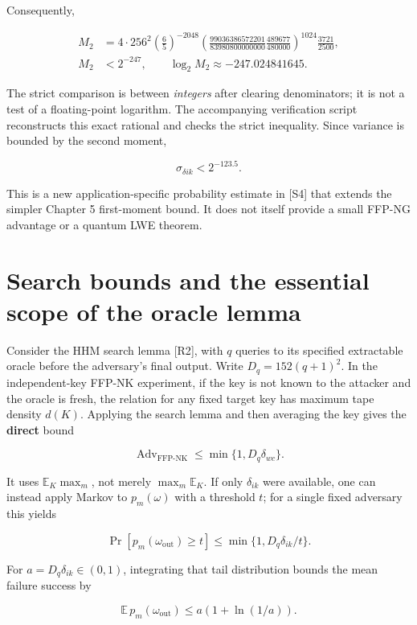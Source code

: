 \documentclass[
  11pt,
  a4paper,
  oneside]{report}
\begin{document}
Consequently,

\[
\begin{split}
M_2&=4\cdot256^2\left(\frac65\right)^{-2048}
\left(\frac{99036386572201}{83980800000000}
\frac{489677}{480000}\right)^{1024}\frac{3721}{2500},\\
M_2&<2^{-247},\qquad
\log_2 M_2\approx-247.024841645.
\end{split}
\]

The strict comparison is between \emph{integers} after clearing
denominators; it is not a test of a floating-point logarithm. The
accompanying verification script reconstructs this exact rational and
checks the strict inequality. Since variance is bounded by the second
moment,

\[
\boxed{\sigma_{\delta ik}<2^{-123.5}.}
\]

This is a new application-specific probability estimate in {[}S4{]} that
extends the simpler Chapter 5 first-moment bound. It does not itself
provide a small FFP-NG advantage or a quantum LWE theorem.

\section{Search bounds and the essential scope of the oracle
lemma}\label{search-bounds-and-the-essential-scope-of-the-oracle-lemma}

Consider the HHM search lemma {[}R2{]}, with \(q\) queries to its
specified extractable oracle before the adversary's final output. Write
\(D_q=152(q+1)^2\). In the independent-key FFP-NK experiment, if the key
is not known to the attacker and the oracle is fresh, the relation for
any fixed target key has maximum tape density \(d(K)\). Applying the
search lemma and then averaging the key gives the \textbf{direct} bound

\[
\operatorname{Adv}_{\mathrm{FFP\text{-}NK}}\le
\min\{1,D_q\delta_{wc}\}.
\]

It uses \(\mathbb E_K\max_m\), not merely \(\max_m\mathbb E_K\). If only
\(\delta_{ik}\) were available, one can instead apply Markov to
\(p_m(\omega)\) with a threshold \(t\); for a single fixed adversary
this yields

\[
\Pr[p_m(\omega_{\mathrm{out}})\ge t]
\le\min\{1,D_q\delta_{ik}/t\}.
\]

For \(a=D_q\delta_{ik}\in(0,1)\), integrating that tail distribution
bounds the mean failure success by

\[
\mathbb E\,p_m(\omega_{\mathrm{out}})\le a(1+\ln(1/a)).
\]
\end{document}
